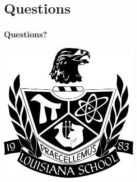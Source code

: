 \documentclass{beamer}
\begin{document}
\section{Questions}
\begin{frame}[t]
	\frametitle{Questions?}
\Large

\hfil\includegraphics[height=2.8in]{LSMSACrest_solid.png}
\end{frame}


%
%
\end{document}
